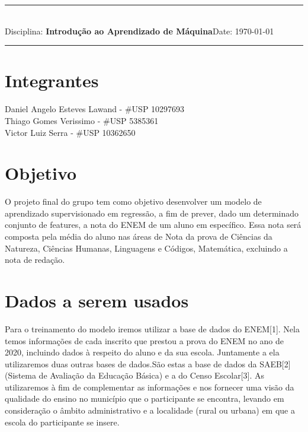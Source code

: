 \documentclass[12pt,a4paper]{article}
\newcommand{\course}{\textbf{Introdução ao Aprendizado de Máquina}}
\begin{document}
\thispagestyle{empty}
\begin{center}
	\vspace{0.5cm}
\end{center}
\noindent
\rule{17cm}{0.2cm}\\[0.3cm]

Disciplina: \course \hfill Date: \today\\
\rule{17cm}{0.05cm}

\section{Integrantes}

Daniel Angelo Esteves Lawand -  \#USP 10297693\\
Thiago Gomes Verissimo - \#USP 5385361\\
Victor Luiz Serra - \#USP 10362650\\

\section{Objetivo}

O projeto final do grupo tem como objetivo desenvolver um modelo de aprendizado supervisionado em regressão, a fim de prever, dado um determinado conjunto de features, a nota do ENEM de um aluno em específico. Essa nota será composta pela média do aluno nas áreas de Nota da prova de Ciências da Natureza, Ciências Humanas, Linguagens e Códigos, Matemática, excluindo a nota de redação.

\section{Dados a serem usados}
Para o treinamento do modelo iremos utilizar a base de dados do ENEM[1]. Nela temos informações de cada inscrito que prestou a prova do ENEM no ano de 2020, incluindo dados à respeito do aluno e da sua escola. Juntamente a ela utilizaremos duas outras bases de dados.São estas a base de dados da SAEB[2] (Sistema de Avaliação da Educação Básica) e a do Censo Escolar[3]. As utilizaremos à fim de complementar as informações e nos fornecer uma visão da qualidade do ensino no município que o participante se encontra, levando em consideração o âmbito administrativo e a localidade (rural ou urbana) em que a escola do participante se insere.
\end{document}
